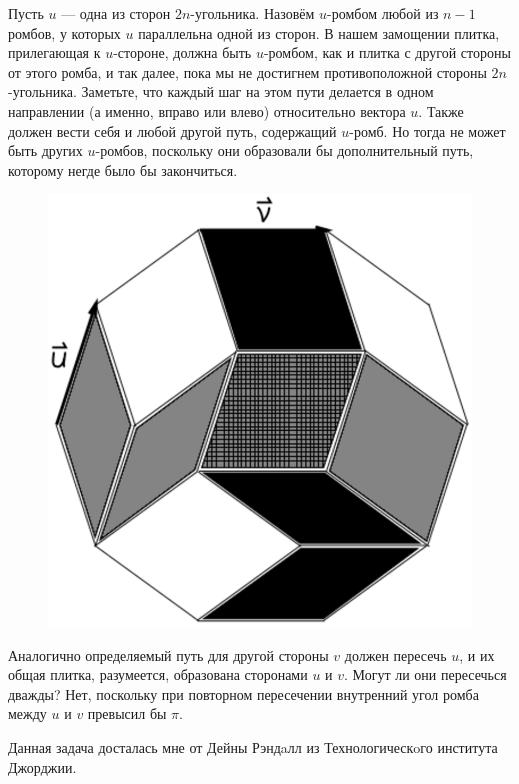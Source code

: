 Пусть $u$ --- одна из сторон $2n$-угольника.
Назовём $u$-ромбом любой из $n-1$ ромбов, у которых $u$ параллельна одной из сторон.
В нашем замощении плитка, прилегающая к $u$-стороне, должна быть $u$-ромбом, как и плитка с другой стороны от этого ромба, и так далее, пока мы не достигнем противоположной стороны $2n$-угольника.
Заметьте, что каждый шаг на этом пути делается в одном направлении (а именно, вправо или влево) относительно вектора $u$. 
Также должен вести себя и любой другой путь, содержащий $u$-ромб.
Но тогда не может быть других $u$-ромбов, поскольку они образовали бы дополнительный путь, которому негде было бы закончиться.

\begin{figure}[h!]
\centering
\includegraphics[scale=0.5]{Figs/Geometry/dimers}
\end{figure}

Аналогично определяемый путь для другой стороны $v$ должен пересечь $u$, и их общая плитка, разумеется, образована сторонами $u$ и $v$.
Могут ли они пересечься дважды?
Нет, поскольку при повторном пересечении внутренний угол ромба между $u$ и $v$ превысил бы $\pi$.\heart

Данная задача досталась мне от Дейны Рэндaлл из Технологическoго института Джорджии.

